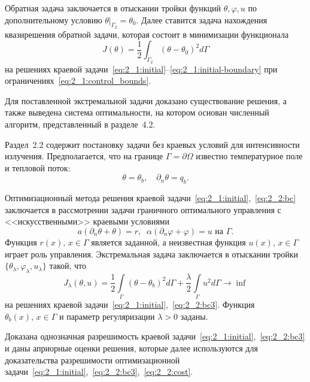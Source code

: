 Обратная задача заключается в отыскании тройки функций $\theta, \varphi, u$
по дополнительному условию $\theta|_{\Gamma_2} = \theta_0$.
Далее ставится задача нахождения квазирешения обратной задачи,
которая состоит в минимизации функционала
\begin{equation}
    \label{eq:2_1:quality}
    J(\theta) = \frac{1}{2} \int_{\Gamma_2} (\theta - \theta_0)^2 d\Gamma
\end{equation}
на решениях краевой задачи~\eqref{eq:2_1:initial}--\eqref{eq:2_1:initial-boundary}
при ограничениях~\eqref{eq:2_1:control_bounds}.

Для поставленной экстремальной задачи доказано существование решения,
а также выведена система оптимальности, на котором
основан численный алгоритм, представленный в разделе~4.2.


Раздел~2.2 содержит постановку задачи без краевых условий для интенсивности излучения.
Предполагается, что на границе $\Gamma = \partial \Omega$ известно температурное поле и тепловой поток:
\begin{equation}
    \label{eq:2_2:bc} \theta = \theta_b, \quad \partial_n\theta = q_b.
\end{equation}

Оптимизационный метода решения краевой задачи~\eqref{eq:2_1:initial},~\eqref{eq:2_2:bc}
заключается в рассмотрении задачи граничного
оптимального управления с <<искусственными>> краевыми условиями
\begin{equation}
    \label{eq:2_2:bc3}
    a(\partial_n\theta+\theta) = r,\;\;
    \alpha(\partial_n\varphi+\varphi) = u \text{ на }\Gamma.
\end{equation}
Функция $r(x),\, x\in\Gamma$ является заданной, а неизвестная функция $u(x),\, x\in\Gamma$
играет роль управления.
Экстремальная задача заключается в отыскании тройки
$\{\theta_\lambda,\varphi_\lambda,u_\lambda\}$ такой, что
\begin{equation}
    \label{eq:2_2:cost}
    J_\lambda(\theta, u) = \frac{1}{2}\int\limits_\Gamma (\theta - \theta_b)^2 d\Gamma
    + \frac{\lambda}{2}\int\limits_\Gamma u^2 d\Gamma \rightarrow\inf
\end{equation}
на решениях краевой задачи~\eqref{eq:2_1:initial},~\eqref{eq:2_2:bc3}.
Функция $\theta_b(x),\, x\in\Gamma$  и параметр регуляризации $\lambda>0$ заданы.


Доказана однозначная разрешимость краевой задачи~\eqref{eq:2_1:initial},~\eqref{eq:2_2:bc3}
и даны априорные оценки решения, которые далее используются для доказательства разрешимости
оптимизационной задачи~\eqref{eq:2_1:initial},~\eqref{eq:2_2:bc3},~\eqref{eq:2_2:cost}.


